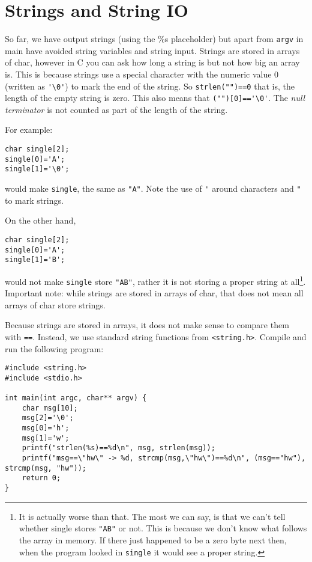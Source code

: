 
\chapter{Strings and String IO}



So far, we have output strings (using the \%s placeholder) but apart from \texttt{argv} in main have avoided string variables and string input.
Strings are stored in arrays of char, however in C you can ask how long a string is but not how big an array is.
This is because strings use a special character with the numeric value $0$ (written as \verb!'\0'!) to mark the end of the string.
So \lstinline!strlen("")==0! that is, the length of the empty string is zero.
This also means that \lstinline!("")[0]=='\0'!.
The \emph{null terminator} is not counted as part of the length of the string.


For example:

\begin{lstlisting}
char single[2];
single[0]='A';
single[1]='\0';
\end{lstlisting}

would make \texttt{single}, the same as \verb!"A"!.
Note the use of \verb!'! around characters and \verb!"! to mark strings.

On the other hand,
\begin{lstlisting}
char single[2];
single[0]='A';
single[1]='B';
\end{lstlisting}
would not make \texttt{single} store \verb!"AB"!, rather it is not storing a proper string at all\footnote{It is actually worse than that.
The most we can say, is that we can't tell whether single stores \texttt{"AB"} or not.
This is because we don't know what follows the array in memory.
If there just happened to be a zero byte next then, when the program looked in \texttt{single} it would see a proper string.
}.
Important note: while strings are stored in arrays of char, that does not mean all arrays of char store strings.

Because strings are stored in arrays, it does not make sense to compare them with \texttt{==}.
Instead, we use standard string functions from \lstinline{<string.h>}.
Compile and run the following program:
\begin{lstlisting}
#include <string.h>
#include <stdio.h>

int main(int argc, char** argv) {
    char msg[10];	
    msg[2]='\0';
    msg[0]='h';
    msg[1]='w';
    printf("strlen(%s)==%d\n", msg, strlen(msg));
    printf("msg==\"hw\" -> %d, strcmp(msg,\"hw\")==%d\n", (msg=="hw"), strcmp(msg, "hw"));
    return 0;
}
\end{lstlisting}

